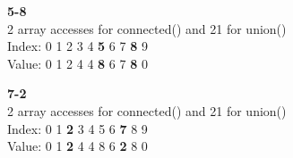 \documentclass{article}
\begin{document}
\textbf{5-8}\\
2 array accesses for connected() and 21 for union()\\
Index: \hspace{4pt}0 \hspace{4pt}1 \hspace{4pt}2 \hspace{4pt}3 \hspace{4pt}4 \hspace{4pt}\textbf{5} \hspace{4pt}6 \hspace{4pt}7 \hspace{4pt}\textbf{8} \hspace{4pt}9\\
Value: \hspace{4pt}0 \hspace{4pt}1 \hspace{4pt}2 \hspace{4pt}4 \hspace{4pt}4 \hspace{4pt}\textbf{8} \hspace{4pt}6 \hspace{4pt}7 \hspace{4pt}\textbf{8} \hspace{4pt}0

\textbf{7-2}\\
2 array accesses for connected() and 21 for union()\\
Index: \hspace{4pt}0 \hspace{4pt}1 \hspace{4pt}\textbf{2} \hspace{4pt}3 \hspace{4pt}4 \hspace{4pt}5 \hspace{4pt}6 \hspace{4pt}\textbf{7} \hspace{4pt}8 \hspace{4pt}9\\
Value: \hspace{4pt}0 \hspace{4pt}1 \hspace{4pt}\textbf{2} \hspace{4pt}4 \hspace{4pt}4 \hspace{4pt}8 \hspace{4pt}6 \hspace{4pt}\textbf{2} \hspace{4pt}8 \hspace{4pt}0
\end{document}
